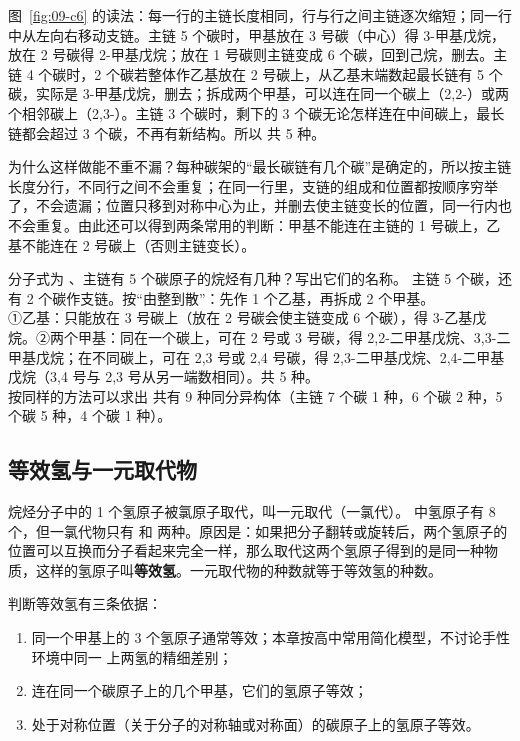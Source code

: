 图~\ref{fig:09-c6} 的读法：每一行的主链长度相同，行与行之间主链逐次缩短；同一行中从左向右移动支链。主链 5 个碳时，甲基放在 3 号碳（中心）得 3-甲基戊烷，放在 2 号碳得 2-甲基戊烷；放在 1 号碳则主链变成 6 个碳，回到己烷，删去。主链 4 个碳时，2 个碳若整体作乙基放在 2 号碳上，从乙基末端数起最长链有 5 个碳，实际是 3-甲基戊烷，删去；拆成两个甲基，可以连在同一个碳上（2,2-）或两个相邻碳上（2,3-）。主链 3 个碳时，剩下的 3 个碳无论怎样连在中间碳上，最长链都会超过 3 个碳，不再有新结构。所以  共 5 种。

为什么这样做能不重不漏？每种碳架的“最长碳链有几个碳”是确定的，所以按主链长度分行，不同行之间不会重复；在同一行里，支链的组成和位置都按顺序穷举了，不会遗漏；位置只移到对称中心为止，并删去使主链变长的位置，同一行内也不会重复。由此还可以得到两条常用的判断：甲基不能连在主链的 1 号碳上，乙基不能连在 2 号碳上（否则主链变长）。

\begin{liti}[典型]
分子式为 、主链有 5 个碳原子的烷烃有几种？写出它们的名称。
\tcblower
\silu 主链 5 个碳，还有 2 个碳作支链。按“由整到散”：先作 1 个乙基，再拆成 2 个甲基。\\
\jie ①乙基：只能放在 3 号碳上（放在 2 号碳会使主链变成 6 个碳），得 3-乙基戊烷。②两个甲基：同在一个碳上，可在 2 号或 3 号碳，得 2,2-二甲基戊烷、3,3-二甲基戊烷；在不同碳上，可在 2,3 号或 2,4 号碳，得 2,3-二甲基戊烷、2,4-二甲基戊烷（3,4 号与 2,3 号从另一端数相同）。共 5 种。\\
\dianbo 按同样的方法可以求出  共有 9 种同分异构体（主链 7 个碳 1 种，6 个碳 2 种，5 个碳 5 种，4 个碳 1 种）。
\end{liti}

\subsection{等效氢与一元取代物}
烷烃分子中的 1 个氢原子被氯原子取代，叫一元取代（一氯代）。 中氢原子有 8 个，但一氯代物只有  和  两种。原因是：如果把分子翻转或旋转后，两个氢原子的位置可以互换而分子看起来完全一样，那么取代这两个氢原子得到的是同一种物质，这样的氢原子叫\textbf{等效氢}。一元取代物的种数就等于等效氢的种数。

判断等效氢有三条依据：
\begin{enumerate}
\item 同一个甲基上的 3 个氢原子通常等效；本章按高中常用简化模型，不讨论手性环境中同一  上两氢的精细差别；
\item 连在同一个碳原子上的几个甲基，它们的氢原子等效；
\item 处于对称位置（关于分子的对称轴或对称面）的碳原子上的氢原子等效。
\end{enumerate}

